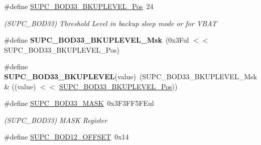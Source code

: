 \begin{DoxyCompactItemize}
\item 
\hypertarget{group___s_a_m_l21___s_u_p_c_gacf6c451ffa020ae14831831758b1c2b6}{}\#define \hyperlink{group___s_a_m_l21___s_u_p_c_gacf6c451ffa020ae14831831758b1c2b6}{S\+U\+P\+C\+\_\+\+B\+O\+D33\+\_\+\+B\+K\+U\+P\+L\+E\+V\+E\+L\+\_\+\+Pos}~24\label{group___s_a_m_l21___s_u_p_c_gacf6c451ffa020ae14831831758b1c2b6}

\begin{DoxyCompactList}\small\item\em (S\+U\+P\+C\+\_\+\+B\+O\+D33) Threshold Level in backup sleep mode or for V\+B\+A\+T \end{DoxyCompactList}\item 
\hypertarget{group___s_a_m_l21___s_u_p_c_ga9c26cfadc0bb0925fc43840c370ab297}{}\#define {\bfseries S\+U\+P\+C\+\_\+\+B\+O\+D33\+\_\+\+B\+K\+U\+P\+L\+E\+V\+E\+L\+\_\+\+Msk}~(0x3\+Ful $<$$<$ S\+U\+P\+C\+\_\+\+B\+O\+D33\+\_\+\+B\+K\+U\+P\+L\+E\+V\+E\+L\+\_\+\+Pos)\label{group___s_a_m_l21___s_u_p_c_ga9c26cfadc0bb0925fc43840c370ab297}

\item 
\hypertarget{group___s_a_m_l21___s_u_p_c_gabc9e153cbd3c12fbb3ace8dc590d1b57}{}\#define {\bfseries S\+U\+P\+C\+\_\+\+B\+O\+D33\+\_\+\+B\+K\+U\+P\+L\+E\+V\+E\+L}(value)~(S\+U\+P\+C\+\_\+\+B\+O\+D33\+\_\+\+B\+K\+U\+P\+L\+E\+V\+E\+L\+\_\+\+Msk \& ((value) $<$$<$ \hyperlink{group___s_a_m_l21___s_u_p_c_gacf6c451ffa020ae14831831758b1c2b6}{S\+U\+P\+C\+\_\+\+B\+O\+D33\+\_\+\+B\+K\+U\+P\+L\+E\+V\+E\+L\+\_\+\+Pos}))\label{group___s_a_m_l21___s_u_p_c_gabc9e153cbd3c12fbb3ace8dc590d1b57}

\item 
\hypertarget{group___s_a_m_l21___s_u_p_c_ga59d9a345100060d6d76bf0d682b16a6f}{}\#define \hyperlink{group___s_a_m_l21___s_u_p_c_ga59d9a345100060d6d76bf0d682b16a6f}{S\+U\+P\+C\+\_\+\+B\+O\+D33\+\_\+\+M\+A\+S\+K}~0x3\+F3\+F\+F5\+F\+Eul\label{group___s_a_m_l21___s_u_p_c_ga59d9a345100060d6d76bf0d682b16a6f}

\begin{DoxyCompactList}\small\item\em (S\+U\+P\+C\+\_\+\+B\+O\+D33) M\+A\+S\+K Register \end{DoxyCompactList}\item 
\hypertarget{group___s_a_m_l21___s_u_p_c_ga7bcdcd4c443f28e82b10f16df46f4058}{}\#define \hyperlink{group___s_a_m_l21___s_u_p_c_ga7bcdcd4c443f28e82b10f16df46f4058}{S\+U\+P\+C\+\_\+\+B\+O\+D12\+\_\+\+O\+F\+F\+S\+E\+T}~0x14\label{group___s_a_m_l21___s_u_p_c_ga7bcdcd4c443f28e82b10f16df46f4058}


\end{DoxyCompactItemize}
